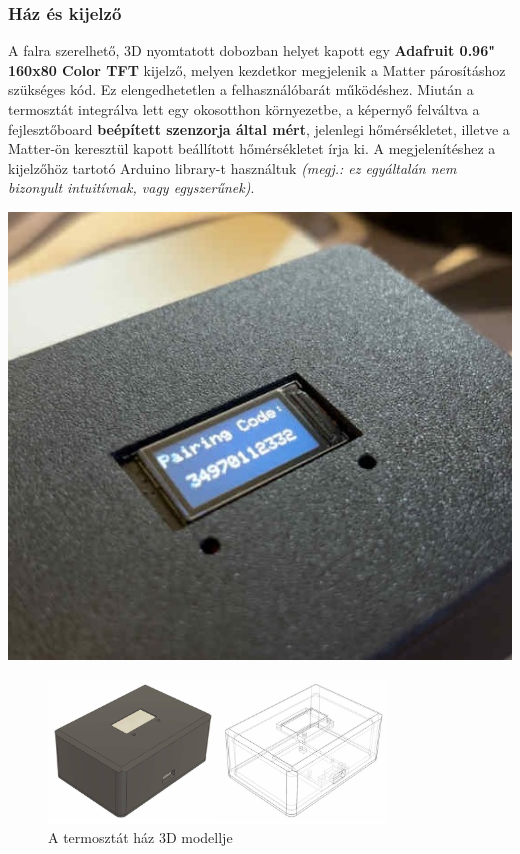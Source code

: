 \documentclass[12pt,a4paper]{article}
\begin{document}
\subsubsection{Ház és kijelző}
\begin{minipage}{0.65\textwidth}
A falra szerelhető, 3D nyomtatott dobozban helyet kapott egy \textbf{Adafruit 0.96" 160x80 Color TFT} kijelző, melyen kezdetkor megjelenik a Matter párosításhoz
szükséges kód. Ez elengedhetetlen a felhasználóbarát működéshez. Miután a termosztát integrálva lett egy okosotthon környezetbe, a képernyő felváltva a
fejlesztőboard \textbf{beépített szenzorja által mért}, jelenlegi hőmérsékletet, illetve a Matter-ön keresztül kapott beállított hőmérsékletet írja ki.
A megjelenítéshez a kijelzőhöz tartotó Arduino library-t használtuk \textit{(megj.: ez egyáltalán nem bizonyult intuitívnak, vagy egyszerűnek)}.
\end{minipage}
\hfill
\begin{minipage}{0.3\textwidth}
    \centering
    \includegraphics[width=\textwidth]{figures/pairing-code.jpg}
\end{minipage}

\begin{figure}[H]
    \centering
    \includegraphics[width=0.8\textwidth]{figures/termosztat-haz.jpg}
    \caption{A termosztát ház 3D modellje}
    \label{fig:rirs}
\end{figure}
\end{document}
